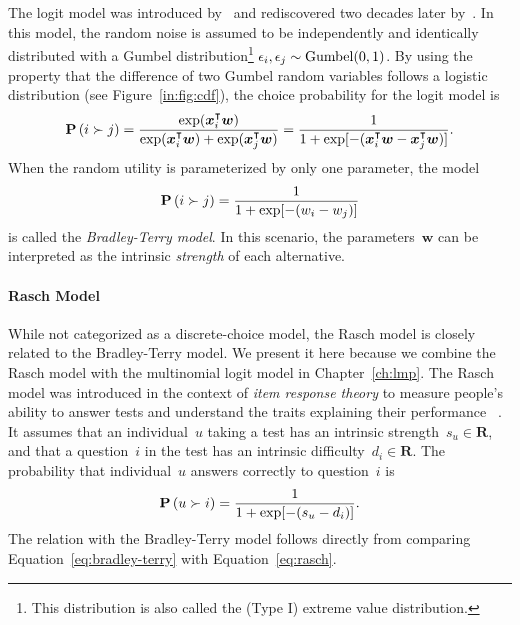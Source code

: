 The logit model was introduced by~\citet{zermelo1928berechnung} and rediscovered two decades later by~\citet{bradley1952rank}.
In this model, the random noise is assumed to be independently and identically distributed with a Gumbel distribution\footnote{This distribution is also called the (Type I) extreme value distribution.} $\epsilon_i, \epsilon_j \sim \mathrm{Gumbel}( 0, 1 )$.
By using the property that the difference of two Gumbel random variables follows a logistic distribution (see Figure~\ref{in:fig:cdf}), the choice probability for the logit model is
\begin{equation*}
	\Prob{i \succ j} = \frac{\exp(\bm{x}_i\Tr \bm{w})}{\exp(\bm{x}_i\Tr \bm{w}) + \exp(\bm{x}_j\Tr \bm{w})} = \frac{1}{1 + \exp[-(\bm{x}_i\Tr \bm{w} - \bm{x}_j\Tr \bm{w})]}. %
\end{equation*}
When the random utility is parameterized by only one parameter, the model
\begin{equation}
	\label{eq:bradley-terry}
	\mathbf{P}\left( i \succ j \right) = \frac{1}{1 + \exp[-(w_i - w_j)]}
\end{equation}
is called the \emph{Bradley-Terry model}.
In this scenario, the parameters~$\bm{w}$ can be interpreted as the intrinsic \emph{strength} of each alternative.

\paragraph{Rasch Model}
While not categorized as a discrete-choice model, the Rasch model is closely related to the Bradley-Terry model.
We present it here because we combine the Rasch model with the multinomial logit model in Chapter~\ref{ch:lmp}.
The Rasch model was introduced in the context of \emph{item response theory} to measure people's ability to answer tests and understand the traits explaining their performance~\citep{rasch1993probabilistic} .
It assumes that an individual~$u$ taking a test has an intrinsic strength~$s_u \in \mathbf{R}$, and that a question~$i$ in the test has an intrinsic difficulty~$d_i \in \mathbf{R}$.
The probability that individual~$u$ answers correctly to question~$i$ is
\begin{equation}
	\label{eq:rasch}
	\mathbf{P}\left( u \succ i \right) = \frac{1}{1 + \exp[-(s_u - d_i)]}.
\end{equation}
The relation with the Bradley-Terry model follows directly from comparing Equation~\ref{eq:bradley-terry} with Equation~\ref{eq:rasch}.

